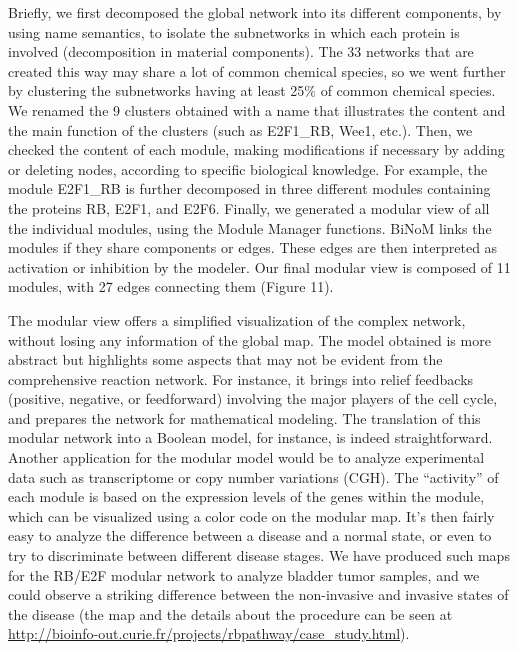 \documentclass[10pt]{bmc_article}
\newenvironment{bmcformat}{\baselineskip20pt\sloppy\setboolean{publ}{false}}{\baselineskip20pt\sloppy}
\begin{document}
\begin{bmcformat}
Briefly, we first decomposed the global network into its different components,
by using name semantics, to isolate the subnetworks in which
each protein is involved (decomposition in material components). The 33 networks that are created this way may share a
lot of common chemical species, so we went further
by clustering the subnetworks having at least 25\% of common chemical species. We renamed
the 9 clusters obtained with a name that illustrates the content and the main
function of the clusters (such as E2F1\_RB, Wee1, etc.). Then, we checked the
content of each module, making modifications if necessary by adding or deleting nodes, according to specific biological knowledge.
For example, the module E2F1\_RB is
further decomposed in three different modules containing the proteins RB, E2F1,
and E2F6. Finally, we generated a modular view of all the individual modules, using the Module Manager functions.
BiNoM links the modules if they share components or edges. These edges are then
interpreted as activation or inhibition by the modeler. Our final
modular view is composed of 11 modules, with 27
edges connecting them (Figure 11).




The modular view offers a simplified visualization of the complex network,
without losing any information of the global map. The
 model obtained is more abstract but highlights some aspects that may not be
evident from the comprehensive reaction network. For instance, it brings into
relief feedbacks (positive, negative, or feedforward) involving the major players of the
cell cycle, and prepares the network for mathematical modeling. The translation
of this modular network into a Boolean model, for instance, is indeed straightforward. Another
application for the modular model would be to analyze experimental data such as
transcriptome or copy number variations (CGH). The ``activity'' of each module
is based on the expression levels of the genes within the module,
which can be visualized using a color code on the modular map. It's then fairly easy to analyze
the difference between a disease and a normal state, or even to try to
discriminate between different disease stages. We have produced such maps for the
RB/E2F modular network to analyze bladder tumor samples, and we could observe a
striking difference between the non-invasive and invasive states of the disease
\cite{calzone2008comprehensive} (the map and the details about the procedure can be seen at
\url{http://bioinfo-out.curie.fr/projects/rbpathway/case_study.html}).


\end{bmcformat}
\end{document}
